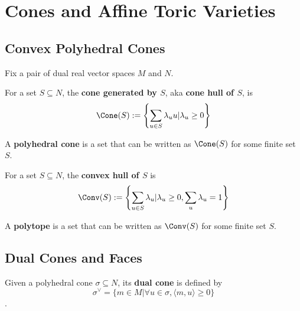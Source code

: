 \section{Cones and Affine Toric Varieties}

\subsection{Convex Polyhedral Cones}

Fix a pair of dual real vector spaces $M$ and $N$.


\begin{definition}
  \label{1-2-1-cone-hull}
  \uses{}
  \leanok

  For a set $S \subseteq N$, the {\bf cone generated by $S$}, aka {\bf cone hull of $S$}, is
  $$\Cone(S) := \left\{\sum_{u \in S} \lambda_u u | \lambda_u \ge 0\right\}$$
\end{definition}


\begin{definition}
  \label{1-2-1-polyhedral-cone}

  A {\bf polyhedral cone} is a set that can be written as $\Cone(S)$ for some finite set $S$.
\end{definition}


\begin{definition}
  \label{1-2-2-convex-hull}
  \uses{}
  \leanok

  For a set $S \subseteq N$, the {\bf convex hull of $S$} is
  $$\Conv(S) := \left\{\sum_{u \in S} \lambda_u | \lambda_u \ge 0, \sum_u \lambda_u = 1\right\}$$
\end{definition}


\begin{definition}[Polytope]
  \label{1-2-2-polytope}
  \leanok

  A {\bf polytope} is a set that can be written as $\Conv(S)$ for some finite set $S$.
\end{definition}


\subsection{Dual Cones and Faces}


\begin{definition}
  \label{1-2-3-dual-cone}
  \leanok

  Given a polyhedral cone $\sigma \subseteq N$, its {\bf dual cone} is defined by
  $$\sigma^\vee = \{m \in M | \forall u \in \sigma, \langle m, u\rangle \ge 0\}$$.
\end{definition}


